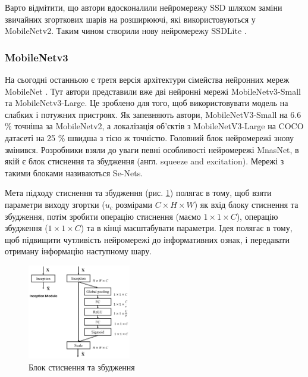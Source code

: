 Варто відмітити, що автори вдосконалили нейромережу SSD \cite{ssd} шляхом заміни
звичайних згорткових шарів на розширюючі, які
використовуються у MobileNetv2. Таким чином створили нову нейромережу SSDLite \cite{mobilenetv2}.

\subsubsection{MobileNetv3}

На сьогодні останньою є третя версія архітектури сімейства нейронних мереж MobileNet \cite{mobilenetv3}.
Тут автори представили вже дві нейронні мережі MobileNetv3-Small та MobileNetv3-Large.
Це зроблено для того, щоб використовувати модель на слабких і потужних пристроях.
Як запевняють автори, MobileNetV3-Small на 6.6 \% точніша за MobileNetv2, а локалізація об'єктів
з MobileNetV3-Large на COCO датасеті на 25 \% швидша з тією  ж точністю.
Головний блок нейромережі знову змінився. Розробники взяли
до уваги певні особливості нейромережі MnasNet, в якій є блок стиснення та збудження
(англ. squeeze and excitation). Мережі з такими блоками називаються Se-Nets.

Мета підходу стиснення та збудження (рис. \ref{fig:cnn:senet_block}) полягає в тому, щоб взяти параметри
виходу згортки ($u_c$ розмірами $C \times H \times W$)
як вхід блоку стиснення та збудження,
потім зробити операцію стиснення (маємо $1 \times 1 \times C$), операцію збудження ($1 \times 1 \times C$) та
в кінці масштабувати параметри.
Ідея полягає в тому, щоб підвищити чутливість нейромережі до інформативних ознак,
і передавати отриману інформацію наступному шару.

\begin{figure}[H]
    \centering
    \includegraphics[width=0.4\textwidth]{images/cnn_senet_block}
    \caption{Блок стиснення та збудження      \cite{squeeze_and_excitation_website}
        \label{fig:cnn:senet_block}
    }
\end{figure}

